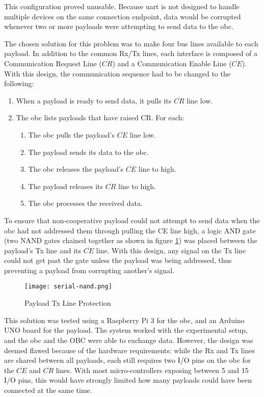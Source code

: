 This configuration proved unusable. Because \acrshort{uart} is not designed
to handle multiple devices on the same connection endpoint, data would be
corrupted whenever two or more payloads were attempting to send data to the
\acrshort{obc}.

The chosen solution for this problem was to make four bus lines available to
each payload. In addition to the common Rx/Tx lines, each interface is composed
of a Communication Request Line ($\overline{CR}$) and a Communication Enable
Line ($\overline{CE}$). With this design, the communication sequence had to
be changed to the following:

\begin{enumerate}
\item When a payload is ready to send data, it pulls its $\overline{CR}$ line
low.
\item The \acrshort{obc} lists payloads that have raised CR. For each:
\begin{enumerate}
\item The \acrshort{obc} pulls the payload's $\overline{CE}$ line low.
\item The payload sends its data to the \acrshort{obc}.
\item The \acrshort{obc} releases the payload's $\overline{CE}$ line to high.
\item The payload releases its $\overline{CR}$ line to high.
\item The \acrshort{obc} processes the received data.
\end{enumerate}
\end{enumerate}

To ensure that non-cooperative payload could not attempt to send data when the
\acrshort{obc} had not addressed them through pulling the CE line high, a logic
AND gate (two NAND gates chained together as shown in figure \ref{fig:uart-nor})
was placed between the payload's Tx line and its $\overline{CE}$ line. With
this design, any signal on the Tx line could not get past the gate unless the
payload was being addressed, thus preventing a payload from corrupting
another's signal.

\begin{figure}[H]
\texttt{[image: serial-nand.png]}
\centering
\caption{Payload Tx Line Protection}
\label{fig:uart-nor}
\end{figure}

This solution was tested using a Raspberry Pi 3 for the \acrlong{obc}, and an
Arduino UNO board for the payload. The system worked with the experimental
setup, and the \acrlong{obc} and the OBC were able to exchange data. However,
the design was deemed flawed because of the hardware requirements: while the Rx
and Tx lines are shared between all payloads, each still requires two I/O pins
on the \acrshort{obc} for the $\overline{CE}$ and $\overline{CR}$ lines. With
most micro-controllers exposing between 5 and 15 I/O pins, this would have
strongly limited how many payloads could have been connected at the same time.

